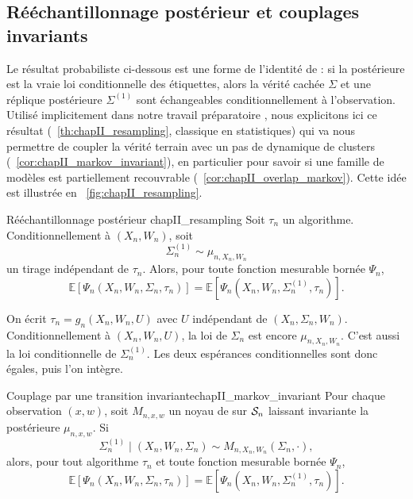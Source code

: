 \subsection{Rééchantillonnage postérieur et couplages invariants}
\label{sec:chapII_couplage}

Le résultat probabiliste ci-dessous est une forme de l'identité de  \cite{Nishimori1980,Nishimori2001} : si la postérieure est la vraie loi conditionnelle des étiquettes, alors la vérité cachée $\Sigma$ et une réplique postérieure $\Sigma^{(1)}$ sont échangeables conditionnellement à l'observation. 
Utilisé implicitement dans notre travail préparatoire \cite{BibiMonterey}, nous explicitons ici ce résultat (\Th~\ref{th:chapII_resampling}, classique en statistiques) qui va nous permettre de coupler la vérité terrain avec un pas de dynamique de clusters (\Cor~\ref{cor:chapII_markov_invariant}), en particulier pour savoir si une famille de modèles est partiellement recouvrable (\Cor~\ref{cor:chapII_overlap_markov}).
Cette idée est illustrée en \Fig~\ref{fig:chapII_resampling}.

\begin{Theoreme}{Rééchantillonnage postérieur \cite{Nishimori1980,Nishimori2001}}{chapII_resampling}
Soit $\tau_n$ un algorithme. Conditionnellement à $(X_n,W_n)$, soit
\[
    \Sigma_n^{(1)}\sim\mu_{n,X_n,W_n}
\]
un tirage indépendant de $\tau_n$. Alors, pour toute fonction mesurable bornée $\Psi_n$,
\begin{equation}
    \mathbb E\left[\Psi_n(X_n,W_n,\Sigma_n,\tau_n)\right]
    =
    \mathbb E\left[\Psi_n(X_n,W_n,\Sigma_n^{(1)},\tau_n)\right].
    \label{eq:chapII_resampling}
\end{equation}
\end{Theoreme}

\begin{Preuve}
On écrit $\tau_n=g_n(X_n,W_n,U)$ avec $U$ indépendant de $(X_n,\Sigma_n,W_n)$. Conditionnellement à $(X_n,W_n,U)$, la loi de $\Sigma_n$ est encore $\mu_{n,X_n,W_n}$. C'est aussi la loi conditionnelle de $\Sigma_n^{(1)}$. Les deux espérances conditionnelles sont donc égales, puis l'on intègre.
\end{Preuve}

\begin{Corollaire}{Couplage par une transition invariante}{chapII_markov_invariant}
Pour chaque observation $(x,w)$, soit $M_{n,x,w}$ un noyau de  sur $\mathcal S_n$ laissant invariante la postérieure $\mu_{n,x,w}$. Si
\[
    \Sigma_n^{(1)}\mid (X_n,W_n,\Sigma_n)
    \sim
    M_{n,X_n,W_n}(\Sigma_n,\cdot),
\]
alors, pour tout algorithme $\tau_n$ et toute fonction mesurable bornée $\Psi_n$,
\begin{equation}
    \mathbb E\left[\Psi_n(X_n,W_n,\Sigma_n,\tau_n)\right]
    =
    \mathbb E\left[\Psi_n(X_n,W_n,\Sigma_n^{(1)},\tau_n)\right].
    \label{eq:chapII_markov_coupling}
\end{equation}
\end{Corollaire}

